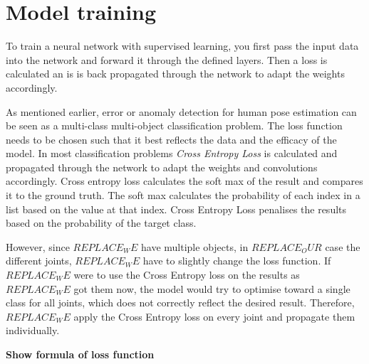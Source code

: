 \section{Model training}
\label{sec:model_training}

To train a neural network with supervised learning, you first pass the input data into the network and forward it through the defined layers. Then a loss is calculated an is is back propagated through the network to adapt the weights accordingly. 

As mentioned earlier, error or anomaly detection for human pose estimation can be seen as a multi-class multi-object classification problem. The loss function needs to be chosen such that it best reflects the data and the efficacy of the model. In most classification problems \textit{Cross Entropy Loss} is calculated and propagated through the network to adapt the weights and convolutions accordingly. Cross entropy loss calculates the soft max of the result and compares it to the ground truth. The soft max calculates the probability of each index in a list based on the value at that index. Cross Entropy Loss penalises the results based on the probability of the target class.

However, since $REPLACE_WE$ have multiple objects, in $REPLACE_OUR$ case the different joints, $REPLACE_WE$ have to slightly change the loss function. If $REPLACE_WE$ were to use the Cross Entropy loss on the results as $REPLACE_WE$ got them now, the model would try to optimise toward a single class for all joints, which does not correctly reflect the desired result. Therefore, $REPLACE_WE$ apply the Cross Entropy loss on every joint and propagate them individually.

\textbf{Show formula of loss function}
